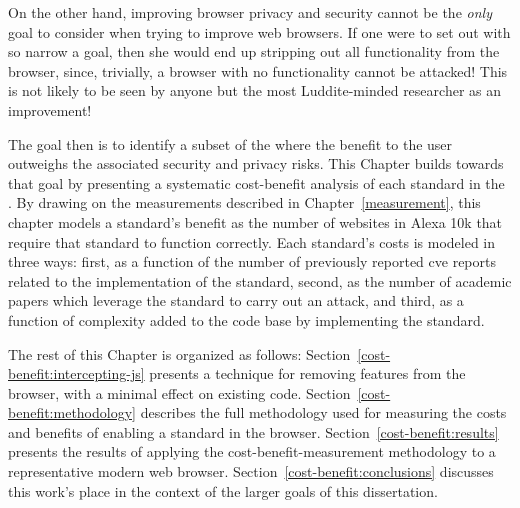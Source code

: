 On the other hand, improving browser privacy and security cannot be the
\textit{only} goal to consider when trying to improve web browsers.  If one
were to set out with so narrow a goal, then she would end up stripping out all
functionality from the browser, since, trivially, a browser with no
functionality cannot be attacked!  This is not likely to be seen by anyone but
the most Luddite-minded researcher as an improvement!

The goal then is to identify a subset of the \WAPI where the benefit to the
user outweighs the associated security and privacy risks.  This Chapter builds
towards that goal by presenting a systematic cost-benefit analysis of each
standard in the \WAPI.  By drawing on the measurements described in
Chapter~\ref{measurement}, this chapter models a standard's benefit as the
number of websites in Alexa 10k that require that standard to function
correctly.  Each standard's costs is modeled in three ways: first, as a
function of the number of previously reported \gls{cve} reports related to the
implementation of the standard, second, as the number of academic papers which
leverage the standard to carry out an attack, and third, as a function of
complexity added to the code base by implementing the standard.

The rest of this Chapter is organized as follows:
Section~\ref{cost-benefit:intercepting-js} presents a technique for removing
\WAPI features from the browser, with a minimal effect on existing code.
Section~\ref{cost-benefit:methodology} describes the full methodology used for
measuring the costs and benefits of enabling a \WAPI standard in the browser.
Section~\ref{cost-benefit:results} presents the results of applying the
cost-benefit-measurement methodology to a representative modern web browser.
Section~\ref{cost-benefit:conclusions} discusses this work's place in the
context of the larger goals of this dissertation.
